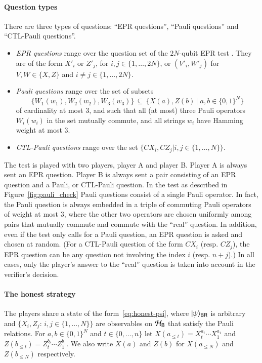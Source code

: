 \paragraph{Question types}
There are three types of questions: ``EPR questions'', ``Pauli questions'' and ``CTL-Pauli questions''. 
\begin{itemize}
\item \emph{EPR questions} range over the question set of the $2N$-qubit EPR test . They are of the form $X'_i$ or $Z'_j$, for $i,j\in\{1,\ldots,2N\}$, or $(V'_i,W'_j)$ for $V,W\in\{X,Z\}$ and $i\neq j \in \{1,\ldots,2N\}$.  
\item \emph{Pauli questions} range over the set of subsets 
$$\{W_1(w_1),W_2(w_2),W_3(w_3)\}\,\subseteq\,\{X(a),Z(b)\,|\; a,b\in\{0,1\}^N\}$$
 of cardinality at most $3$, and such that all (at most) three Pauli operators $W_i(w_i)$ in the set mutually commute, and all strings $w_i$ have Hamming weight at most $3$.
\item \emph{CTL-Pauli questions} range over the set $\{CX_i,CZ_j|i,j\in\{1,\ldots,N\}\}$.
\end{itemize}
The test is played with two players, player A and player B. Player A is always sent an EPR question. Player B is always sent a pair consisting of an EPR question and a Pauli, or CTL-Pauli question. In the test as described in Figure~\ref{fig:pauli_check} Pauli questions consist of a single Pauli operator. In fact, the Pauli question is always embedded in a triple of commuting Pauli operators of weight at most $3$, where the other two operators are chosen uniformly among pairs that mutually commute and commute with the ``real'' question. In addition, even if the test only calls for a Pauli question, an EPR question is asked and chosen at random. (For a CTL-Pauli question of the form $CX_i$ (resp. $CZ_j$), the EPR question can be any question not involving the index $i$ (resp. $n+j$).) In all cases, only the player's answer to the ``real'' question is taken into account in the verifier's decision. 

\paragraph{The honest strategy}
The players share a state of the form~\eqref{eq:honest-psi}, where $|\psi\rangle_{{\textsf{BR}}}$ is arbitrary and $\{X_i,Z_j:\, i,j\in\{1,\ldots,N\}\}$ are observables on $\mathcal{H}_{\textsf{B}}$ that satisfy the Pauli relations. For $a,b\in \{0,1\}^N$ and $t\in\{0,\ldots,n\}$ let $X(a_{\leq t}) = X_t^{a_t}\cdots X_1^{a_1}$ and $Z(b_{\leq t}) = Z_t^{b_t}\cdots Z_1^{b_1}$. We also write $X(a)$ and $Z(b)$ for $X(a_{\leq N})$ and $Z(b_{\leq N})$ respectively. 

